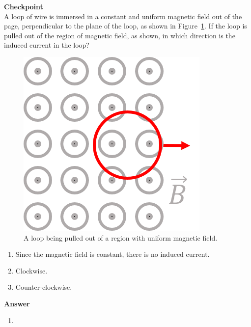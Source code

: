 \begin{framed}
\textbf{Checkpoint}\\
A loop of wire is immersed in a constant and uniform magnetic field out of the page, perpendicular to the plane of the loop, as shown in Figure~\ref{fig:induction:loopout}. If the loop is pulled out of the region of magnetic field, as shown, in which direction is the induced current in the loop?

\begin{figure}[!htbp]
\centering
\includegraphics[width=0.2\linewidth]{files/loopout-c0263da4236539f3c5aaa3e78bcf7ece.png}
\caption[]{A loop being pulled out of a region with uniform magnetic field.}
\label{fig:induction:loopout}
\end{figure}

\begin{enumerate}
\item Since the magnetic field is constant, there is no induced current.
\item Clockwise.
\item Counter-clockwise.
\end{enumerate}

\begin{framed}
\textbf{Answer}\\
\begin{enumerate}[resume]
\item
\end{enumerate}
\end{framed}
\end{framed}

